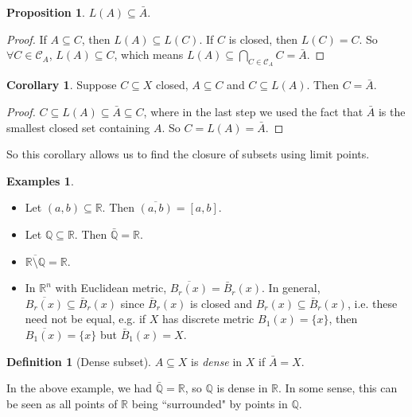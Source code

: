 \documentclass[a4paper,11pt]{article}
\theoremstyle{definition}
\newtheorem*{defn}{Definition}
\newtheorem*{prop}{Proposition}
\newtheorem*{exs}{Examples}
\newtheorem*{cor}{Corollary}
\numberwithin{equation}{section}
\begin{document}
\begin{prop}
    $L(A)\subseteq\bar{A}$.
\end{prop}

\begin{proof}
If $A\subseteq C$, then $L(A)\subseteq L(C)$. If $C$ is closed, then $L(C)=C$. So $\forall C\in\mathcal{C}_A$, $L(A)\subseteq C$, which means $L(A)\subseteq\bigcap_{C\in\mathcal{C}_A}C=\bar{A}$.
\end{proof}

\begin{cor}
Suppose $C\subseteq X$ closed, $A\subseteq C$ and $C\subseteq L(A)$. Then $C=\bar{A}$.
\end{cor}

\begin{proof}
$C\subseteq L(A)\subseteq \bar{A}\subseteq C$, where in the last step we used the fact that $\bar{A}$ is the smallest closed set containing $A$. So $C=L(A)=\bar{A}$.
\end{proof}

So this corollary allows us to find the closure of subsets using limit points.

\begin{exs}
\leavevmode
\begin{itemize}
    \item Let $(a,b)\subseteq\mathbb{R}$. Then $\overline{(a,b)} = [a,b]$.
    \item Let $\mathbb{Q}\subseteq \mathbb{R}$. Then $\bar{\mathbb{Q}}=\mathbb{R}$.
    \item $\overline{\mathbb{R}\setminus\mathbb{Q}}=\mathbb{R}$.
    \item In $\mathbb{R}^n$ with Euclidean metric, $\overline{B_r(x)}=\bar{B}_r(x)$. In general, $\overline{B_r(x)}\subseteq\bar{B}_r(x)$ since $\bar{B}_r(x)$ is closed and $B_r(x)\subseteq\bar{B}_r(x)$, i.e. these need not be equal, e.g. if $X$ has discrete metric $B_1(x)=\{x\}$, then $\overline{B_1(x)}=\{x\}$ but $\bar{B}_1(x)=X$.
\end{itemize}
\end{exs}

\begin{defn}[Dense subset]
    $A\subseteq X$ is \emph{dense} in $X$ if $\bar{A}=X$.
\end{defn}

In the above example, we had $\bar{\mathbb{Q}}=\mathbb{R}$, so $\mathbb{Q}$ is dense in $\mathbb{R}$. In some sense, this can be seen as all points of $\mathbb{R}$ being ``surrounded" by points in $\mathbb{Q}$.
\end{document}
